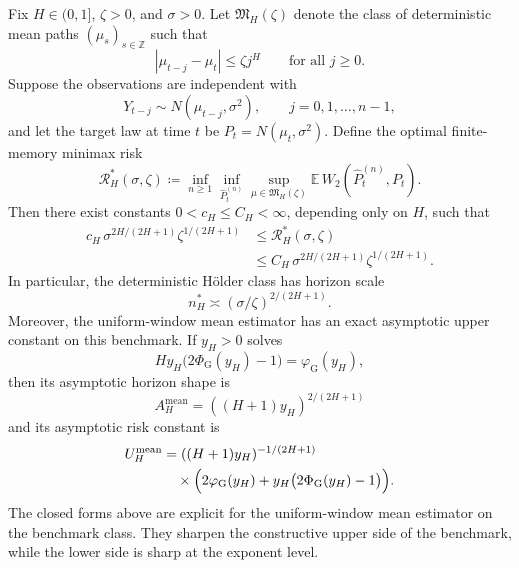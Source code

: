 \begin{theorem}
\label{thm:gaussian_location_minimax_holder}
Fix $H\in(0,1]$, $\zeta>0$, and $\sigma>0$. Let $\mathfrak M_H(\zeta)$ denote the
class of deterministic mean paths $(\mu_s)_{s\in\mathbb Z}$ such that
\[
  |\mu_{t-j}-\mu_t|\le \zeta j^H
  \qquad\text{for all }j\ge 0.
\]
Suppose the observations are independent with
\[
  Y_{t-j}\sim N(\mu_{t-j},\sigma^2),
  \qquad j=0,1,\dots,n-1,
\]
and let the target law at time $t$ be $P_t=N(\mu_t,\sigma^2)$. Define the
optimal finite-memory minimax risk
\[
  \mathcal R_H^*(\sigma,\zeta)
  \coloneqq
  \inf_{n\ge 1}
  \inf_{\widehat P_t^{(n)}}
  \sup_{\mu\in\mathfrak M_H(\zeta)}
  \mathbb E\,W_2\!\left(\widehat P_t^{(n)},P_t\right).
\]
Then there exist constants $0<c_H\le C_H<\infty$, depending only on $H$, such
that
\[
  \begin{aligned}
  c_H\,\sigma^{2H/(2H+1)}\zeta^{1/(2H+1)}
  &\le \mathcal R_H^*(\sigma,\zeta) \\
  &\le C_H\,\sigma^{2H/(2H+1)}\zeta^{1/(2H+1)}.
  \end{aligned}
\]
In particular, the deterministic H\"older class has horizon scale
\[
  n_H^*\asymp (\sigma/\zeta)^{2/(2H+1)}.
\]
Moreover, the uniform-window mean estimator has an exact asymptotic upper
constant on this benchmark. If $y_H>0$ solves
\[
  H y_H\bigl(2\Phi_{\mathrm G}(y_H)-1\bigr)=\varphi_{\mathrm G}(y_H),
\]
then its asymptotic horizon shape is
\[
  A_H^{\mathrm{mean}}=((H+1)y_H)^{2/(2H+1)}
\]
and its asymptotic risk constant is
\[
  \begin{aligned}
  U_H^{\mathrm{mean}}
  &= ((H+1)y_H)^{-1/(2H+1)} \\
  &\quad \times \Bigl(2\varphi_{\mathrm G}(y_H)+y_H\bigl(2\Phi_{\mathrm G}(y_H)-1\bigr)\Bigr).
  \end{aligned}
\]
The closed forms above are explicit for the uniform-window mean estimator on the
benchmark class. They sharpen the constructive upper side of the benchmark,
while the lower side is sharp at the exponent level.
\end{theorem}

